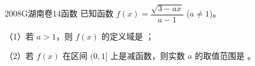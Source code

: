 
\begin{problem}{2008}{G}{湖南卷}{14}{函数}
已知函数 $f(x)=\dfrac{\sqrt{3-ax}}{a-1}$ ($a\ne 1$)。

（1）若 $a>1$，则 $f(x)$ 的定义域是 \underline{\hspace{4em}}；

（2）若 $f(x)$ 在区间 $(0,1]$ 上是减函数，则实数 $a$ 的取值范围是 \underline{\hspace{4em}}。
\end{problem}

\begin{answer}

\end{answer}

\begin{solutions}

\end{solutions}